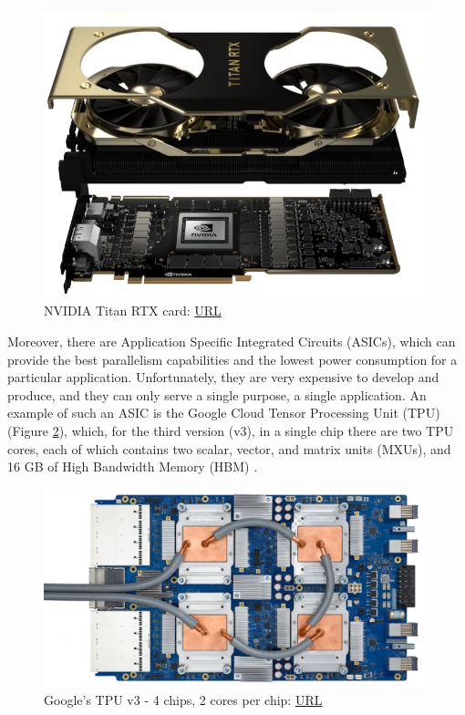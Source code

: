 \begin{figure} [H]
	\centering
	\includegraphics[scale=0.5]{Images/Hardware/NVIDIA-Titan-RTX.png}
	\decoRule
	\caption[NVIDIA Titan RTX card]{NVIDIA Titan RTX card: \href{https://www.nvidia.com/en-us/deep-learning-ai/products/titan-rtx/}{URL}}
	\label{fig:nvidia-titan-rtx-explosion-view}
\end{figure}

Moreover, there are Application Specific Integrated Circuits (ASICs), which can provide the best parallelism capabilities and the lowest power consumption for a particular application. Unfortunately, they are very expensive to develop and produce, and they can only serve a single purpose, a single application. An example of such an ASIC is the Google Cloud Tensor Processing Unit (TPU) (Figure \ref{fig:google-tpu-motherboard}), which, for the third version (v3), in a single chip there are two TPU cores, each of which contains two scalar, vector, and matrix units (MXUs), and 16 GB of High Bandwidth Memory (HBM) \cite{Google-Cloud-TPU}.

\begin{figure} [H]
	\centering
	\includegraphics[width=\textwidth]{Images/Hardware/tpu-v3.png}
	\decoRule
	\caption[Google's TPU v3]{Google's TPU v3 - 4 chips, 2 cores per chip: \href{https://cloud.google.com/tpu/docs/system-architecture}{URL}}
	\label{fig:google-tpu-motherboard}
\end{figure}

